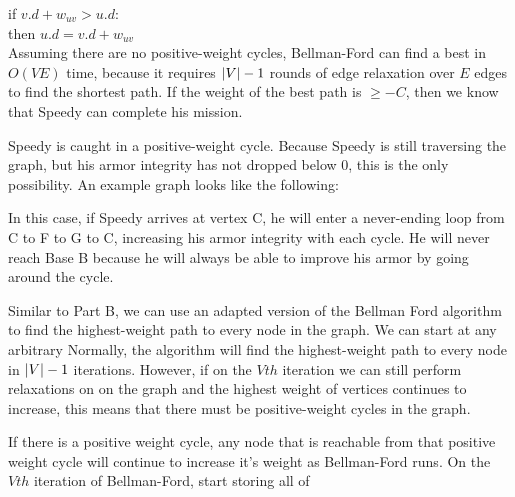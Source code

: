 \documentclass[12pt,twoside]{article}
\begin{document}
\begin{problems}
\begin{problemparts}
if $v.d + w_{uv} > u.d$:\\
then $u.d = v.d + w_{uv}$\\

Assuming there are no positive-weight cycles, Bellman-Ford can find a best in $O(VE)$ time, because it requires $\left| V\right| - 1$ rounds of edge relaxation over $E$ edges to find the shortest path. If the weight of the best path is $\geq -C$, then we know that Speedy can complete his mission.

\problempart Speedy is caught in a positive-weight cycle. Because Speedy is still traversing the graph, but his armor integrity has not dropped below 0, this is the only possibility. An example graph looks like the following:


In this case, if Speedy arrives at vertex C, he will enter a never-ending loop from C to F to G to C, increasing his armor integrity with each cycle. He will never reach Base B because he will always be able to improve his armor by going around the cycle.

\problempart Similar to Part B, we can use an adapted version of the Bellman Ford algorithm to find the highest-weight path to every node in the graph. We can start at any arbitrary Normally, the algorithm will find the highest-weight path to every node in $\left| V\right|-1$ iterations. However, if on the $Vth$ iteration we can still perform relaxations on on the graph and the highest weight of vertices continues to increase, this means that there must be positive-weight cycles in the graph. 

If there is a positive weight cycle, any node that is reachable from that positive weight cycle will continue to increase it's weight as Bellman-Ford runs. On the $Vth$ iteration of Bellman-Ford, start storing all of 


\end{problemparts}
\end{problems}
\end{document}
